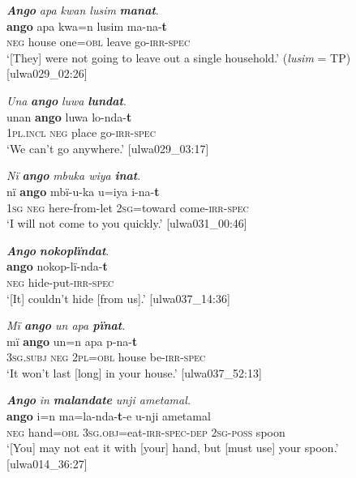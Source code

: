 \ea%
    \label{ex:verbs:79}
          \textbf{\textit{Ango}} \textit{apa kwan lusim} \textbf{\textit{manat}}.\\
\gll \textbf{ango}  apa    kwa=n    lusim  ma-na-\textbf{t}\\
    \textsc{neg}  house  one=\textsc{obl}  leave  go-\textsc{irr-spec}\\
\glt `[They] were not going to leave out a single household.’ (\textit{lusim} = TP) [ulwa029\_02:26]
\z

\ea%
    \label{ex:verbs:80}
          \textit{Una} \textbf{\textit{ango}} \textit{luwa} \textbf{\textit{lundat}}.\\
\gll unan    \textbf{ango}  luwa  lo{}-nda-\textbf{t}\\
    1\textsc{pl.incl}  \textsc{neg}  place  go-\textsc{irr-spec}\\
\glt `We can’t go anywhere.’ [ulwa029\_03:17]
\z

\ea%
    \label{ex:verbs:81}
          \textit{Nï} \textbf{\textit{ango}} \textit{mbuka wiya} \textbf{\textit{inat}}.\\
\gll nï    \textbf{ango}  mbï-u-ka    u=iya       i-na-\textbf{t}\\
    1\textsc{sg}  \textsc{neg}  here-from-let  2\textsc{sg}=toward  come-\textsc{irr-spec}\\
\glt `I will not come to you quickly.’ [ulwa031\_00:46]
\z

\ea%
    \label{ex:verbs:82}
          \textbf{\textit{Ango}} \textbf{\textit{nokoplïndat}}.\\
\gll \textbf{ango}  nokop-lï-nda-\textbf{t}\\
    \textsc{neg}  hide-put-\textsc{irr-spec}\\
\glt `[It] couldn’t hide [from us].’ [ulwa037\_14:36]
\z

\ea%
    \label{ex:verbs:83}
          \textit{Mï \textbf{ango} un apa \textbf{pïnat}}.\\
\gll mï       \textbf{ango}  un=n    apa    p-na-\textbf{t}\\
    3\textsc{sg.subj}  \textsc{neg}  2\textsc{pl=obl}  house  be\textsc{{}-irr-spec}\\
\glt `It won’t last [long] in your house.’ [ulwa037\_52:13]
\z

\ea%
    \label{ex:verbs:84}
          \textbf{\textit{Ango}} \textit{in} \textbf{\textit{malandate}} \textit{unji ametamal.}\\
\gll    \textbf{ango}  i=n      ma=la-nda-\textbf{t}{}-e          u-nji    ametamal\\
    \textsc{neg}  hand=\textsc{obl}  \textsc{3sg.obj}=eat-\textsc{irr-spec-dep}  2\textsc{sg-poss}  spoon\\
\glt `[You] may not eat it with [your] hand, but [must use] your spoon.’ [ulwa014\_36:27]
\z

